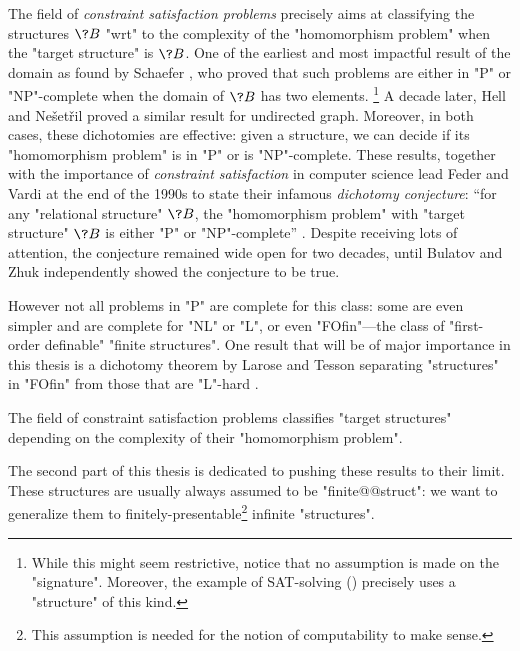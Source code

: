 The field of \emph{constraint satisfaction problems} precisely aims at classifying the
structures $\?B$ "wrt" to the complexity of the "homomorphism problem" when the
"target structure" is $\?B$. One of the earliest and most impactful result
of the domain as found by Schaefer \cite{Schaefer1978ComplexitySatisfiability},
who proved that such problems are either in "P" or "NP"-complete when the domain of $\?B$
has two elements.%
\footnote{While this might seem restrictive, notice that no assumption is made on the "signature".
Moreover, the example of SAT-solving () precisely uses a "structure" of this kind.}
A decade later, Hell and Ne\v{s}et\v{r}il \cite{HellNesetril1990ComplexityColoring}
proved a similar result for undirected graph.
Moreover, in both cases, these dichotomies are effective: given a structure, we can decide if
its "homomorphism problem" is in "P" or is "NP"-complete.
These results, together with the importance of \emph{constraint satisfaction} in computer science
lead Feder and Vardi at the end of the 1990s
to state their infamous \emph{dichotomy conjecture}: ``for any "relational structure" $\?B$,
the "homomorphism problem" with "target structure" $\?B$ is either "P"
or "NP"-complete'' \cite{FederVardi1998ComputationalStructure}.
Despite receiving lots of attention, the conjecture remained wide open for two decades, until
Bulatov \cite{Bulatov2017DichotomyCSPs} and Zhuk \cite{Zhuk2020CSPDichotomy} independently
showed the conjecture to be true.

However not all problems in "P" are complete for this class: some are even simpler and are complete
for "NL" or "L", or even "FOfin"---the class of "first-order definable" "finite structures".
One result that will be of major importance in this thesis is a dichotomy
theorem by Larose and Tesson separating "structures" in "FOfin" from those that are "L"-hard
\cite{LaroseTesson2009UniversalAlgebraCSP}.

\begin{known}
	The field of constraint satisfaction problems classifies "target structures"
	depending on the complexity of their "homomorphism problem".
\end{known}

The second part of this thesis is dedicated to pushing these results to their limit.
These structures are usually always assumed to be "finite@@struct": we want to generalize them
to finitely-presentable\footnote{This assumption is needed for the notion
of computability to make sense.} infinite "structures".

